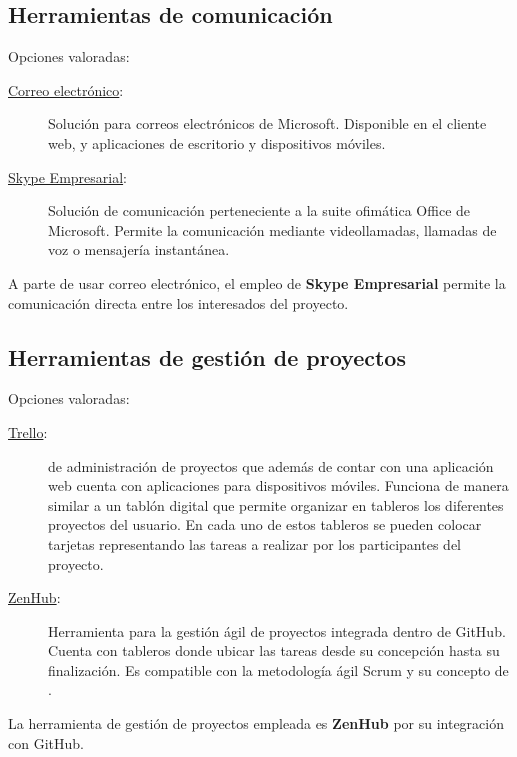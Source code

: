 \subsection{Herramientas de comunicación}{\label{sec:comms}}
Opciones valoradas:
\begin{description}
  \item[\href{https://products.office.com/es-es/outlook/email-and-calendar-software-microsoft-outlook?rtc=1}
  {Correo electrónico}:] Solución para correos electrónicos de Microsoft. 
  Disponible en el cliente web, y aplicaciones de escritorio y dispositivos 
  móviles.
  \item[\href{https://www.skype.com/es/business/}{Skype Empresarial}:] Solución
  de comunicación perteneciente a la suite ofimática Office de Microsoft.
  Permite la comunicación mediante videollamadas, llamadas de voz o mensajería
  instantánea.
\end{description}

A parte de usar correo electrónico, el empleo de \textbf{Skype Empresarial}
permite la comunicación directa entre los interesados del proyecto.

\newpage

\subsection{Herramientas de gestión de proyectos}{\label{sec:mgmt}}
Opciones valoradas:
\begin{description}
  \item[\href{https://trello.com/}{Trello}:]  de
  administración de proyectos que además de contar con una aplicación web cuenta
  con aplicaciones para dispositivos móviles. Funciona de manera similar a un
  tablón digital que permite organizar en tableros los diferentes proyectos del
  usuario. En cada uno de estos tableros se pueden colocar tarjetas
  representando las tareas a realizar por los participantes del proyecto.
  \item[\href{https://www.zenhub.com/}{ZenHub}:] Herramienta para la gestión
  ágil de proyectos integrada dentro de GitHub. Cuenta con tableros donde ubicar
  las tareas desde su concepción hasta su finalización. Es compatible con la
  metodología ágil Scrum y su concepto de .
\end{description}

La herramienta de gestión de proyectos empleada es \textbf{ZenHub} por su
integración con GitHub.

